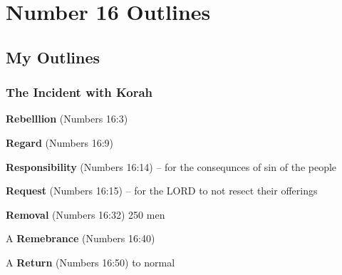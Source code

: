 \section{Number 16 Outlines}

\subsection{My Outlines}

\subsubsection{The Incident with Korah}

\begin{compactenum}[I.]
    \item  \textbf{Rebelllion}  (Numbers 16:3) 
    \item  \textbf{Regard}  (Numbers 16:9) 
    \item  \textbf{Responsibility}  (Numbers 16:14)  -- for the consequnces of sin of the people
    \item  \textbf{Request}  (Numbers 16:15)  -- for the LORD to not resect their offerings
    \item  \textbf{Removal}  (Numbers 16:32)  250 men\
    \item  A \textbf{Remebrance}  (Numbers 16:40)
    \item  A \textbf{Return} \index[scripture]{Numbers!Num 16:50} (Numbers 16:50) to normal
\end{compactenum}



